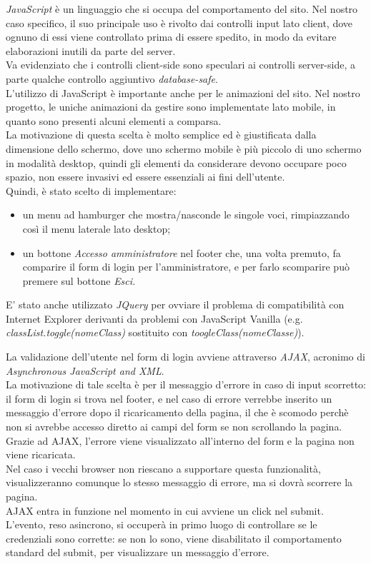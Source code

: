 ﻿\emph{JavaScript} è un linguaggio che si occupa del comportamento del sito. Nel nostro caso specifico, il suo principale uso è rivolto dai controlli 
input lato client, dove ognuno di essi viene controllato prima di essere spedito, in modo da evitare elaborazioni inutili da parte del server.\\
Va evidenziato che i controlli client-side sono speculari ai controlli server-side, a parte qualche controllo aggiuntivo \emph{database-safe}.\\
L'utilizzo di JavaScript è importante anche per le animazioni del sito. Nel nostro progetto, le uniche animazioni da gestire sono implementate 
lato mobile, in quanto sono presenti alcuni elementi a comparsa.\\
La motivazione di questa scelta è molto semplice ed è giustificata dalla dimensione dello schermo, dove uno schermo mobile è più piccolo di uno schermo
in modalità desktop, quindi gli elementi da considerare devono occupare poco spazio, non essere invasivi ed essere essenziali ai fini dell'utente. \\
Quindi, è stato scelto di implementare:
\begin{itemize}
    \item un menu ad hamburger che mostra/nasconde le singole voci, rimpiazzando così il menu laterale lato desktop;
    \item un bottone \emph{Accesso amministratore} nel footer che, una volta premuto, fa comparire il form di login per l'amministratore, e per farlo
    scomparire può premere sul bottone \emph{Esci.} 
\end{itemize}
E' stato anche utilizzato \emph{JQuery} per ovviare il problema di compatibilità con Internet Explorer derivanti da problemi con JavaScript Vanilla
(e.g. \emph{classList.toggle(nomeClass)} sostituito con \emph{toogleClass(nomeClasse)}).    

La validazione dell'utente nel form di login avviene attraverso \emph{AJAX}, acronimo di \emph{Asynchronous JavaScript and XML}.\\ 
La motivazione di tale scelta è per il messaggio d'errore in caso di input scorretto: il form di login si trova nel footer, e nel caso di errore 
verrebbe inserito un messaggio d'errore dopo il ricaricamento della pagina, il che è scomodo perchè non si avrebbe accesso diretto ai campi del form
se non scrollando la pagina.\\
Grazie ad AJAX, l'errore viene visualizzato all'interno del form e la pagina non viene ricaricata.\\
Nel caso i vecchi browser non riescano a supportare questa funzionalità, visualizzeranno comunque lo stesso messaggio di errore, ma si dovrà scorrere la pagina.\\
AJAX entra in funzione nel momento in cui avviene un click nel submit. L'evento, reso asincrono, si occuperà in primo luogo di controllare 
se le credenziali sono corrette: se non lo sono, viene disabilitato il comportamento standard del submit, per visualizzare 
un messaggio d'errore.\\